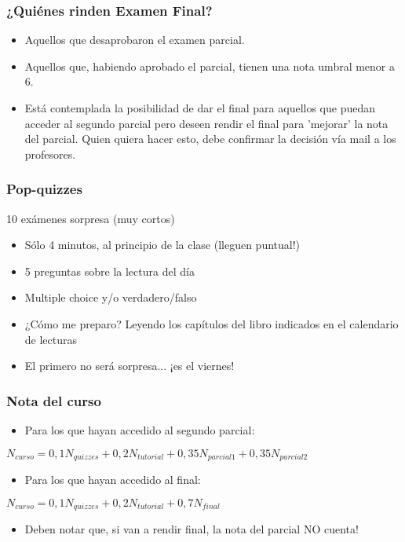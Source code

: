 \documentclass{beamer}
\begin{document}
\begin{frame}
    \frametitle{¿Quiénes rinden Examen Final?} 
    \begin{itemize}
        \item Aquellos que desaprobaron el examen parcial. \vspace{2mm}
        \item Aquellos que, habiendo aprobado el parcial, tienen una nota umbral menor a 6. \vspace{2mm}
        \item Está contemplada la posibilidad de dar el final para aquellos que puedan acceder al segundo parcial pero deseen rendir el final para 'mejorar' la nota del parcial. Quien quiera hacer esto, debe confirmar la decisión vía mail a los profesores. 
    \end{itemize}
\end{frame}

\begin{frame}
    \frametitle{Pop-quizzes}
    10 exámenes sorpresa (muy cortos) \vspace{2mm}
    \begin{itemize}
        \item Sólo 4 minutos, al principio de la clase (lleguen puntual!)
        \item 5 preguntas sobre la lectura del día
        \item Multiple choice y/o verdadero/falso
        \item ¿Cómo me preparo? Leyendo los capítulos del libro indicados en el calendario de lecturas
        \item El primero no será sorpresa... ¡es el viernes!
    \end{itemize}
\end{frame}

\begin{frame}
    \frametitle{Nota del curso}
    \small
    \begin{itemize}
        \item Para los que hayan accedido al segundo parcial: \\
    \end{itemize}
    \begin{center}{$N_{curso}=0,1N_{quizzes}+0,2N_{tutorial}+0,35N_{parcial 1}+0,35N_{parcial 2}$}
    \end{center} \vspace{2mm}
    \begin{itemize}
        \item Para los que hayan accedido al final:
    \end{itemize} 
    \begin{center}
    {$N_{curso}=0,1N_{quizzes}+0,2N_{tutorial}+0,7N_{final}$}
    \end{center} \vspace{2mm}
    \begin{itemize}    
        \item Deben notar que, si van a rendir final, la nota del parcial NO cuenta!
    \end{itemize}
\end{frame}
\end{document}
